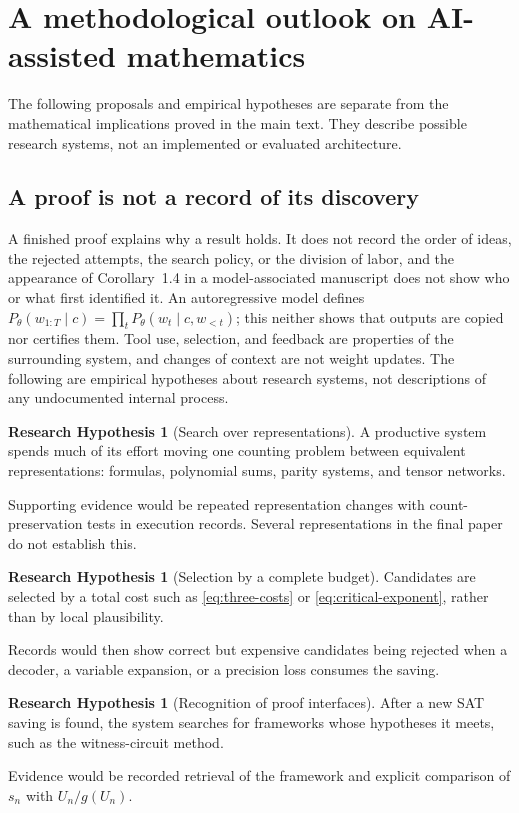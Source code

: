\documentclass[11pt,reqno]{amsart}
\numberwithin{equation}{section}
\theoremstyle{plain}
\theoremstyle{definition}
\newtheorem{hypothesis}[theorem]{Research Hypothesis}
\theoremstyle{remark}
\begin{document}

\section{A methodological outlook on AI-assisted mathematics}\label{app:ai}
The following proposals and empirical hypotheses are separate from the
mathematical implications proved in the main text. They describe possible
research systems, not an implemented or evaluated architecture.

\subsection{A proof is not a record of its discovery}\label{sec:discovery}
A finished proof explains why a result holds. It does not record the order
of ideas, the rejected attempts, the search policy, or the division of labor,
and the appearance of Corollary~1.4 in a model-associated manuscript does not
show who or what first identified it. An autoregressive model defines
$P_\theta(w_{1:T}\mid c)=\prod_tP_\theta(w_t\mid c,w_{<t})$; this neither
shows that outputs are copied nor certifies them. Tool use, selection, and
feedback are properties of the surrounding system, and changes of context are
not weight updates. The following are empirical hypotheses about research
systems, not descriptions of any undocumented internal process.

\begin{hypothesis}[Search over representations]
A productive system spends much of its effort moving one counting problem
between equivalent representations: formulas, polynomial sums, parity
systems, and tensor networks.
\end{hypothesis}
\noindent Supporting evidence would be repeated representation changes with
count-preservation tests in execution records. Several representations in the
final paper do not establish this.

\begin{hypothesis}[Selection by a complete budget]
Candidates are selected by a total cost such as \eqref{eq:three-costs} or
\eqref{eq:critical-exponent}, rather than by local plausibility.
\end{hypothesis}
\noindent Records would then show correct but expensive candidates being
rejected when a decoder, a variable expansion, or a precision loss consumes
the saving.

\begin{hypothesis}[Recognition of proof interfaces]
After a new SAT saving is found, the system searches for frameworks whose
hypotheses it meets, such as the witness-circuit method.
\end{hypothesis}
\noindent Evidence would be recorded retrieval of the framework and explicit
comparison of $s_n$ with $U_n/g(U_n)$.
\end{document}
